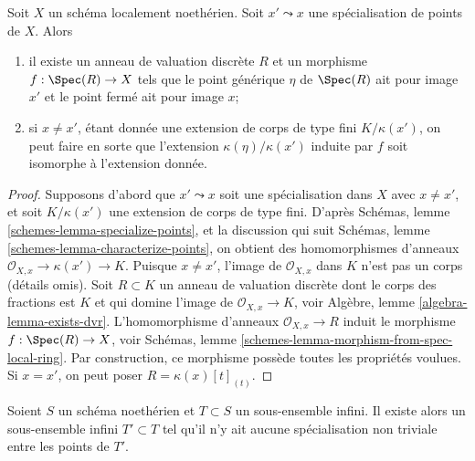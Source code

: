 \begin{lemma}
\label{lemma-locally-Noetherian-specialization-dvr}
Soit $X$ un schéma localement noethérien.
Soit $x' \leadsto x$ une spécialisation de points de $X$. Alors
\begin{enumerate}
\item il existe un anneau de valuation discrète $R$ et un morphisme
$f : \Spec(R) \to X$ tels que le point générique $\eta$ de
$\Spec(R)$ ait pour image $x'$ et le point fermé ait pour image $x$;
\item si $x \not = x'$, étant donnée une extension de corps
de type fini $K/\kappa(x')$, on peut faire en sorte que l'extension
$\kappa(\eta)/\kappa(x')$
induite par $f$ soit isomorphe à l'extension donnée.
\end{enumerate}
\end{lemma}

\begin{proof}
Supposons d'abord que $x' \leadsto x$ soit une spécialisation dans $X$
avec $x \not = x'$, et soit $K/\kappa(x')$ une extension
de corps de type fini. D'après
Schémas, lemme \ref{schemes-lemma-specialize-points},
et la discussion qui suit
Schémas, lemme \ref{schemes-lemma-characterize-points},
on obtient des homomorphismes d'anneaux $\mathcal{O}_{X, x} \to \kappa(x') \to K$.
Puisque $x \not = x'$, l'image de $\mathcal{O}_{X, x}$ dans $K$
n'est pas un corps (détails omis).
Soit $R \subset K$ un anneau de valuation discrète dont le corps des fractions est
$K$ et qui domine l'image de $\mathcal{O}_{X, x} \to K$, voir
Algèbre, lemme \ref{algebra-lemma-exists-dvr}.
L'homomorphisme d'anneaux $\mathcal{O}_{X, x} \to R$ induit le morphisme
$f : \Spec(R) \to X$, voir
Schémas, lemme \ref{schemes-lemma-morphism-from-spec-local-ring}.
Par construction, ce morphisme possède toutes les propriétés voulues.
Si $x = x'$, on peut poser $R = \kappa(x)[t]_{(t)}$.
\end{proof}

\begin{lemma}
\label{lemma-thin-infinite-sequence}
Soient $S$ un schéma noethérien et $T \subset S$ un sous-ensemble infini.
Il existe alors un sous-ensemble infini $T' \subset T$
tel qu'il n'y ait aucune spécialisation non triviale entre les points de $T'$.
\end{lemma}

